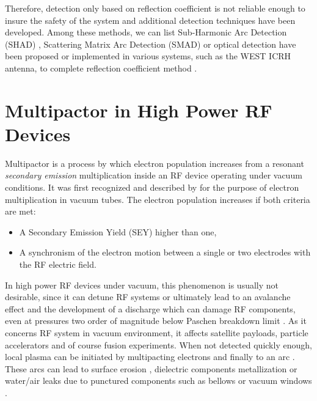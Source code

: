 Therefore, detection only based on reflection coefficient is not reliable enough to insure the safety of the system and additional detection techniques have been developed. Among these methods, we can list Sub-Harmonic Arc Detection (SHAD) , Scattering Matrix Arc Detection (SMAD)  or optical detection have been proposed or implemented in various systems, such as the WEST ICRH antenna, to complete reflection coefficient method . 



\section[Multipactor]{Multipactor in High Power RF Devices}
Multipactor is a process by which electron population increases from a resonant \textit{secondary emission} multiplication inside an RF device operating under vacuum conditions. It was first recognized and described by  for the purpose of electron multiplication in vacuum tubes. The electron population increases if both criteria are met: 
\begin{itemize}
	\item A Secondary Emission Yield (SEY) higher than one,
	\item A synchronism of the electron motion between a single  or two electrodes with the RF electric field.
\end{itemize}

In high power RF devices under vacuum, this phenomenon is usually not desirable, since it can detune RF systems or ultimately lead to an avalanche effect and the development of a discharge which can damage RF components, even at pressures two order of magnitude below Paschen breakdown limit . As it concerns RF system in vacuum environment, it affects satellite payloads, particle accelerators  and of course fusion experiments. When not detected quickly enough, local plasma can be initiated by multipacting electrons and finally to an arc . These arcs can lead to surface erosion , dielectric components metallization  or water/air leaks due to punctured components such as bellows or vacuum windows . 

